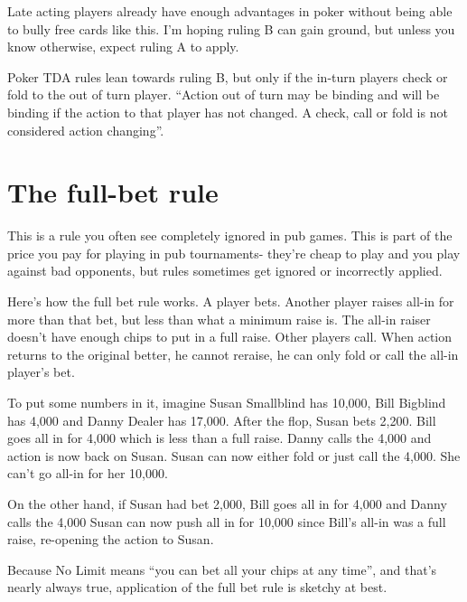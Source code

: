 Late acting players already have enough advantages in poker without 
being able to bully free cards like this. I'm hoping ruling B can 
gain ground, but unless you know otherwise, expect ruling A to apply.

Poker TDA rules lean towards ruling B, but only if the in-turn players
check or fold to the out of turn player. ``Action out of turn may be binding
and will be binding if the action to that player has not changed. A
check, call or fold is not considered action changing''.


\section{The full-bet rule}

This is a rule you often see completely ignored in pub games. 
This is part of the price you pay for playing
in pub tournaments- they're cheap to play and you play against
bad opponents, but rules sometimes get ignored or incorrectly applied.


Here's how the full bet rule works. A player bets. Another player 
raises all-in for more than that bet, but less than what a minimum raise is. 
The all-in raiser doesn't have enough chips to put in a full raise. 
Other players call. When action returns to the original better, he 
cannot reraise, he can only fold or call the all-in player's bet.

To put some numbers in it, imagine Susan Smallblind has 10,000,
Bill Bigblind has 4,000 and Danny Dealer has 17,000. After the flop, 
Susan bets 2,200. Bill goes all in for 4,000 which is less
than a full raise. Danny calls the 4,000 and action is now back on Susan.
Susan can now either fold or just call the 4,000. She can't go all-in 
for her 10,000.

On the other hand, if Susan had bet 2,000, Bill goes all in for 4,000
and Danny calls the 4,000 Susan can now push all in for 10,000 since
Bill's all-in was a full raise, re-opening the action to Susan.

Because No Limit means ``you can bet all your chips at any time'', and
that's nearly always true, application of the full bet rule is sketchy
at best.

